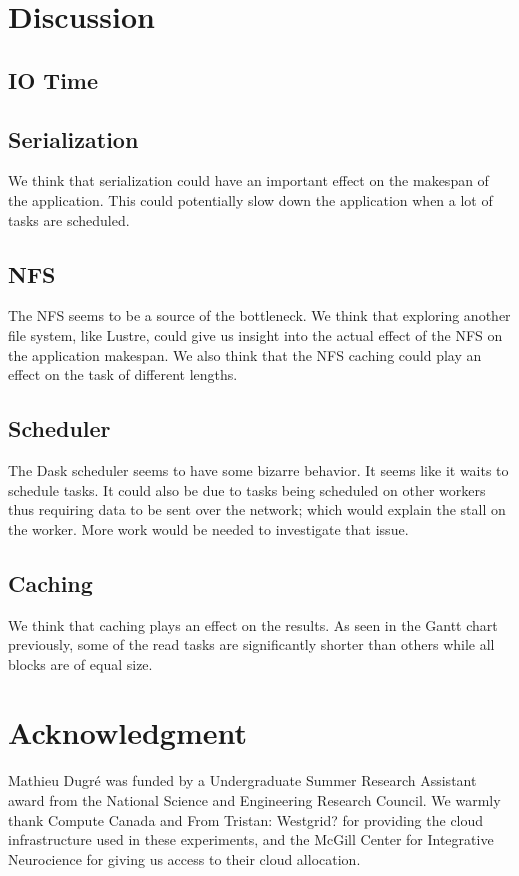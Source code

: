 \documentclass[conference]{IEEEtran}
\newcommand{\TG}[1]{\color{cyan}From Tristan: #1 \color{black}}
\begin{document}
\section{Discussion}
\subsection{IO Time}


\subsection{Serialization}
We think that serialization could have an important effect on the makespan of the
application. This could potentially slow down the application when a lot of tasks are
scheduled.

\subsection{NFS}
The NFS seems to be a source of the bottleneck. We think that exploring another file
system, like Lustre, could give us insight into the actual effect of the NFS on the
application makespan. We also think that the NFS caching could play an effect on the
task of different lengths.

\subsection{Scheduler}
The Dask scheduler seems to have some bizarre behavior. It seems like it waits to
schedule tasks. It could also be due to tasks being scheduled on other workers
thus requiring data to be sent over the network; which would explain the stall on the
worker. More work would be needed to investigate that issue.


\subsection{Caching}
We think that caching plays an effect on the results. As seen in the Gantt chart
previously, some of the read tasks are significantly shorter than others while all
blocks are of equal size.

\section*{Acknowledgment}

Mathieu Dugr\'e was funded by a Undergraduate Summer Research Assistant
award from the National Science and Engineering Research Council. We warmly
thank Compute Canada and \TG{Westgrid?} for providing the cloud
infrastructure used in these experiments, and the McGill Center for
Integrative Neurocience for giving us access to their cloud allocation.



\end{document}
